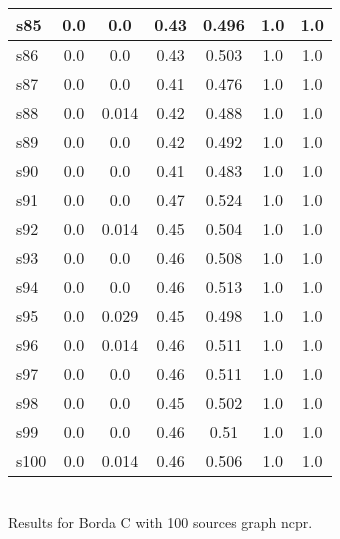 \documentclass{article}
\begin{document}
\begin{tabular}{|l|c|c|c|c|c|c|}
\hline
s85 &0.0 & 0.0 & 0.43 & 0.496 & 1.0 & 1.0\\
\hline
s86 &0.0 & 0.0 & 0.43 & 0.503 & 1.0 & 1.0\\
\hline
s87 &0.0 & 0.0 & 0.41 & 0.476 & 1.0 & 1.0\\
\hline
s88 &0.0 & 0.014 & 0.42 & 0.488 & 1.0 & 1.0\\
\hline
s89 &0.0 & 0.0 & 0.42 & 0.492 & 1.0 & 1.0\\
\hline
s90 &0.0 & 0.0 & 0.41 & 0.483 & 1.0 & 1.0\\
\hline
s91 &0.0 & 0.0 & 0.47 & 0.524 & 1.0 & 1.0\\
\hline
s92 &0.0 & 0.014 & 0.45 & 0.504 & 1.0 & 1.0\\
\hline
s93 &0.0 & 0.0 & 0.46 & 0.508 & 1.0 & 1.0\\
\hline
s94 &0.0 & 0.0 & 0.46 & 0.513 & 1.0 & 1.0\\
\hline
s95 &0.0 & 0.029 & 0.45 & 0.498 & 1.0 & 1.0\\
\hline
s96 &0.0 & 0.014 & 0.46 & 0.511 & 1.0 & 1.0\\
\hline
s97 &0.0 & 0.0 & 0.46 & 0.511 & 1.0 & 1.0\\
\hline
s98 &0.0 & 0.0 & 0.45 & 0.502 & 1.0 & 1.0\\
\hline
s99 &0.0 & 0.0 & 0.46 & 0.51 & 1.0 & 1.0\\
\hline
s100 &0.0 & 0.014 & 0.46 & 0.506 & 1.0 & 1.0\\
\hline
\end{tabular}\\

\noindent Results for Borda C with 100 sources graph ncpr.
\end{document}
